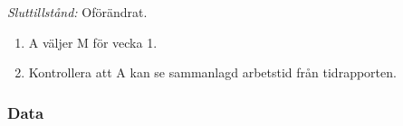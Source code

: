 \documentclass[a4paper]{article}
\def\reqinside{\hfil\penalty 100 \hfilneg \hbox}
\def \req [#1]{\reqinside{[SRS krav #1]}}
\begin{document}
\begin{FT}
\emph{Sluttillstånd:} Oförändrat.

\begin{enumerate}
\item A väljer M för vecka 1.
\item Kontrollera att A kan se sammanlagd arbetstid från tidrapporten.
\end{enumerate}






\end{FT}


\subsubsection{Data}
\end{document}
